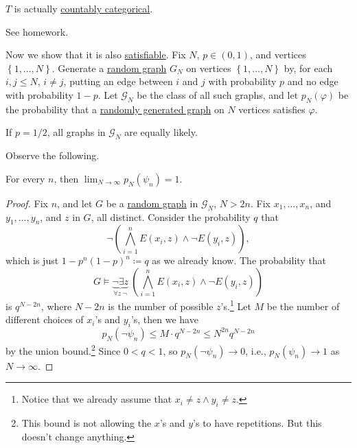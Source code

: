 \begin{remark}
	\(T\) is actually \hyperref[def:countably-categorical]{countably categorical}.
\end{remark}
\begin{explanation}
	See homework.
\end{explanation}

Now we show that it is also \hyperref[def:satisfiable]{satisfiable}. Fix \(N\), \(p\in (0, 1)\), and vertices \(\left\{ 1, \ldots , N \right\} \). Generate a \hyperref[def:random-graph]{random graph} \(G_N\) on vertices \(\left\{ 1, \ldots , N \right\} \) by, for each \(i, j \leq N\), \(i \neq j\), putting an edge between \(i\) and \(j\) with probability \(p\) and no edge with probability \(1 - p\). Let \(\mathcal{G} _N\) be the class of all such graphs, and let \(p_N(\varphi )\) be the probability that a \hyperref[def:random-graph]{randomly generated graph} on \(N\) vertices satisfies \(\varphi \).

\begin{eg}
	If \(p = 1 / 2\), all graphs in \(\mathcal{G} _N\) are equally likely.
\end{eg}

Observe the following.

\begin{proposition}\label{prop:random-graph-almost-surely-satisfiable}
	For every \(n\), then \(\lim_{N \to \infty} p_N(\psi _n) = 1\).
\end{proposition}
\begin{proof}
	Fix \(n\), and let \(G\) be a \hyperref[def:random-graph]{random graph} in \(\mathcal{G} _N\), \(N > 2n\). Fix \(x_1, \ldots , x_n\), and \(y_1, \ldots , y_n\), and \(z\) in \(G\), all distinct. Consider the probability \(q\) that
	\[
		\lnot \left( \bigwedge_{i=1}^{n} E(x_i, z) \land \lnot E(y_i, z)\right),
	\]
	which is just \(1 - p^n (1-p)^n \coloneqq q\) as we already know. The probability that
	\[
		G \models \underbrace{\lnot \exists z}_{\forall z\ \lnot }\ \left( \bigwedge_{i=1}^{n} E(x_i, z) \land \lnot E(y_i, z) \right)
	\]
	is \(q^{N-2n}\), where \(N-2n\) is the number of possible \(z\)'s.\footnote{Notice that we already assume that \( x_i \neq z \land y_i \neq z\).} Let \(M\) be the number of different choices of \(x_i\)'s and \(y_i\)'s, then we have
	\[
		p_N(\lnot \psi _n)
		\leq M\cdot q^{N - 2n}
		\leq N^{2n} q^{N-2n}
	\]
	by the union bound.\footnote{This bound is not allowing the \(x\)'s and \(y\)'s to have repetitions. But this doesn't change anything.} Since \(0 < q < 1\), so \(p_N (\lnot \psi _n) \to 0\), i.e., \(p_N(\psi _n) \to 1\) as \(N \to \infty \).
\end{proof}

